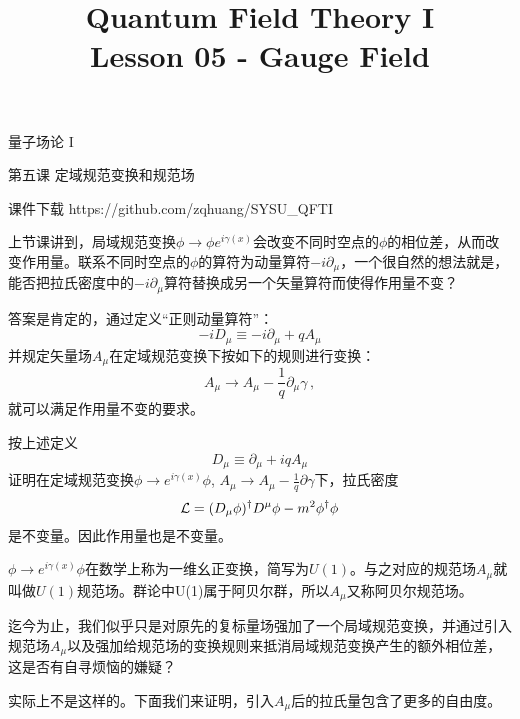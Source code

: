 \documentclass[CJK]{beamer}
\title{Quantum Field Theory I \\ Lesson 05 - Gauge Field}
\author{}
\date{}
\begin{document}
\begin{frame}
 
\begin{center}
\begin{Large}
\bch
量子场论 I 

{\vskip 0.3in}

第五课 定域规范变换和规范场

\ech
\end{Large}
\end{center}

\vskip 0.2in

\bch
课件下载
\ech
https://github.com/zqhuang/SYSU\_QFTI

\end{frame}



\begin{frame}
\bch
上节课讲到，局域规范变换$\phi \rightarrow \phi e^{i\gamma(x)}$会改变不同时空点的$\phi$的相位差，从而改变作用量。联系不同时空点的$\phi$的算符为动量算符$-i\partial_\mu$，一个很自然的想法就是，能否把拉氏密度中的$-i\partial_\mu$算符替换成另一个矢量算符而使得作用量不变？

\skipline
答案是肯定的，通过定义“正则动量算符”：
$$-iD_\mu \equiv -i\partial_\mu + q A_\mu$$
并规定矢量场$A_\mu$在定域规范变换下按如下的规则进行变换：
$$ A_\mu \rightarrow A_\mu - \frac{1}{q} \partial_\mu \gamma\, ,$$
就可以满足作用量不变的要求。

\ech
\end{frame}

\begin{frame}
\bch
按上述定义
$$D_\mu \equiv \partial_\mu + iq A_\mu$$
证明在定域规范变换$\phi \rightarrow e^{i\gamma(x)}\phi$, $A_\mu \rightarrow A_\mu - \frac{1}{q}\partial\gamma$下，拉氏密度
$${\mathcal{L}} = (D_\mu\phi)^\dagger D^\mu\phi - m^2\phi^\dagger \phi$$
是不变量。因此作用量也是不变量。

\skipline
$\phi \rightarrow e^{i\gamma(x)}\phi$在数学上称为一维幺正变换，简写为$U(1)$。与之对应的规范场$A_\mu$就叫做$U(1)$规范场。群论中U(1)属于阿贝尔群，所以$A_\mu$又称阿贝尔规范场。
\ech
\end{frame}

\begin{frame}
\bch

迄今为止，我们似乎只是对原先的复标量场强加了一个局域规范变换，并通过引入规范场$A_\mu$以及强加给规范场的变换规则来抵消局域规范变换产生的额外相位差，这是否有自寻烦恼的嫌疑？

\skipline
实际上不是这样的。下面我们来证明，引入$A_\mu$后的拉氏量包含了更多的自由度。

\ech
\end{frame}
\end{document}
